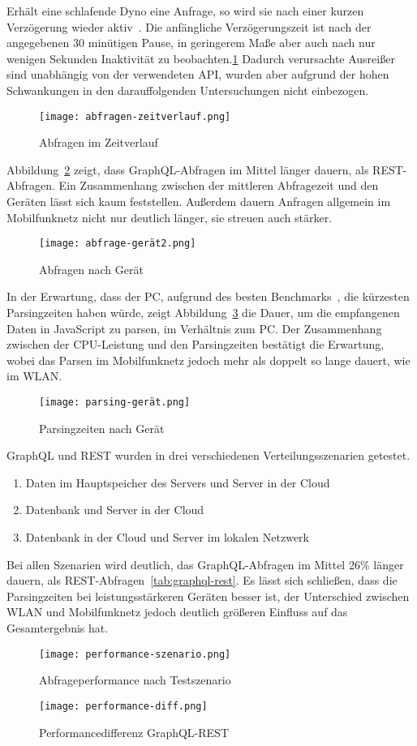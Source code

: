 Erhält eine schlafende Dyno eine Anfrage, so wird sie nach einer kurzen Verzögerung wieder aktiv~\cite[vgl.][]{Heroku}.
Die anfängliche Verzögerungszeit ist nach der angegebenen 30 minütigen Pause, in geringerem Maße aber auch nach nur wenigen Sekunden Inaktivität zu beobachten.\ref{img:abfrage-zeitverlauf}
Dadurch verursachte Ausreißer sind unabhängig von der verwendeten API, wurden aber aufgrund der hohen Schwankungen in den darauffolgenden Untersuchungen nicht einbezogen. 
\begin{figure}[H]
  \centering
  \texttt{[image: abfragen-zeitverlauf.png]}
  \caption{Abfragen im Zeitverlauf}\label{img:abfrage-zeitverlauf}
\end{figure}
Abbildung~\ref{img:abfrage-gerät} zeigt, dass GraphQL-Abfragen im Mittel länger dauern, als REST-Abfragen.
Ein Zusammenhang zwischen der mittleren Abfragezeit und den Geräten lässt sich kaum feststellen.
Außerdem dauern Anfragen allgemein im Mobilfunknetz nicht nur deutlich länger, sie streuen auch stärker.
\begin{figure}[H]
  \centering
  \texttt{[image: abfrage-gerät2.png]}
  \caption{Abfragen nach Gerät}\label{img:abfrage-gerät}
\end{figure}
In der Erwartung, dass der PC, aufgrund des besten Benchmarks~\cite{Benchmark}, die kürzesten Parsingzeiten haben würde, zeigt Abbildung~\ref{img:parsing-gerät} die Dauer, um die empfangenen Daten in JavaScript zu parsen, im Verhältnis zum PC.
Der Zusammenhang zwischen der CPU-Leistung und den Parsingzeiten bestätigt die Erwartung, wobei das Parsen im Mobilfunknetz jedoch mehr als doppelt so lange dauert, wie im WLAN.
\begin{figure}[H]
  \centering
  \texttt{[image: parsing-gerät.png]}
  \caption{Parsingzeiten nach Gerät}\label{img:parsing-gerät}
\end{figure}
\par
GraphQL und REST wurden in drei verschiedenen Verteilungsszenarien getestet.
\begin{enumerate}
  \item Daten im Hauptspeicher des Servers und Server in der Cloud
  \item Datenbank und Server in der Cloud
  \item Datenbank in der Cloud und Server im lokalen Netzwerk
\end{enumerate}
Bei allen Szenarien wird deutlich, das GraphQL-Abfragen im Mittel 26\% länger dauern, als  REST-Abfragen~\ref{tab:graphql-rest}.
Es lässt sich schließen, dass die Parsingzeiten bei leistungsstärkeren Geräten besser ist, der Unterschied zwischen WLAN und Mobilfunknetz jedoch deutlich größeren Einfluss auf das Gesamtergebnis hat.
\begin{figure}[H]
  \centering
  \texttt{[image: performance-szenario.png]}
  \caption{Abfrageperformance nach Testszenario}\label{img:performance-szenario}
\end{figure}
\begin{figure}[H]
  \centering
  \texttt{[image: performance-diff.png]}
  \caption{Performancedifferenz GraphQL-REST}\label{img:performance-diff}
\end{figure}

